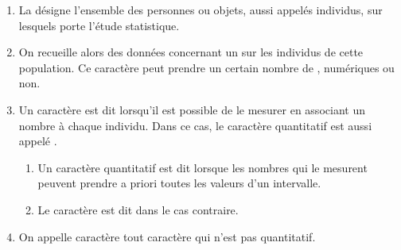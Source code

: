 \begin{enumerate}
    \item La  désigne l'ensemble des personnes ou objets,
  aussi appelés individus, sur lesquels porte l'étude
  statistique.  
\item On recueille alors des données concernant un  sur
  les individus de cette population. Ce caractère peut prendre un
  certain nombre de , numériques ou non.
\item Un caractère est dit  lorsqu'il est possible de
  le mesurer en associant un nombre à chaque individu. Dans ce cas, le
  caractère quantitatif est aussi appelé .
  \begin{enumerate}
      \item Un caractère quantitatif est dit  lorsque les
    nombres qui le mesurent peuvent prendre a priori toutes les
    valeurs d'un intervalle.
\item Le caractère est dit  dans le cas contraire.
  \end{enumerate}
\item On appelle caractère  tout caractère qui n'est
  pas quantitatif.
\end{enumerate}


